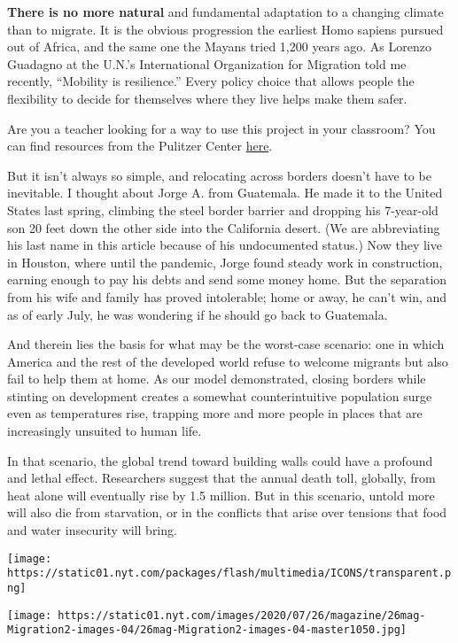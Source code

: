 \textbf{There is no more natural} and fundamental adaptation to a
changing climate than to migrate. It is the obvious progression the
earliest Homo sapiens pursued out of Africa, and the same one the Mayans
tried 1,200 years ago. As Lorenzo Guadagno at the U.N.'s International
Organization for Migration told me recently, ``Mobility is resilience.''
Every policy choice that allows people the flexibility to decide for
themselves where they live helps make them safer.

Are you a teacher looking for a way to use this project in your
classroom? You can find resources from the Pulitzer Center
\href{https://pulitzercenter.org/event/webinar-educators-exploring-climate-migration-classroom}{here}.

But it isn't always so simple, and relocating across borders doesn't
have to be inevitable. I thought about Jorge A. from Guatemala. He made
it to the United States last spring, climbing the steel border barrier
and dropping his 7-year-old son 20 feet down the other side into the
California desert. (We are abbreviating his last name in this article
because of his undocumented status.) Now they live in Houston, where
until the pandemic, Jorge found steady work in construction, earning
enough to pay his debts and send some money home. But the separation
from his wife and family has proved intolerable; home or away, he can't
win, and as of early July, he was wondering if he should go back to
Guatemala.

And therein lies the basis for what may be the worst-case scenario: one
in which America and the rest of the developed world refuse to welcome
migrants but also fail to help them at home. As our model demonstrated,
closing borders while stinting on development creates a somewhat
counterintuitive population surge even as temperatures rise, trapping
more and more people in places that are increasingly unsuited to human
life.

In that scenario, the global trend toward building walls could have a
profound and lethal effect. Researchers suggest that the annual death
toll, globally, from heat alone will eventually rise by 1.5 million. But
in this scenario, untold more will also die from starvation, or in the
conflicts that arise over tensions that food and water insecurity will
bring.

\texttt{[image: https://static01.nyt.com/packages/flash/multimedia/ICONS/transparent.png]}

\texttt{[image: https://static01.nyt.com/images/2020/07/26/magazine/26mag-Migration2-images-04/26mag-Migration2-images-04-master1050.jpg]}


